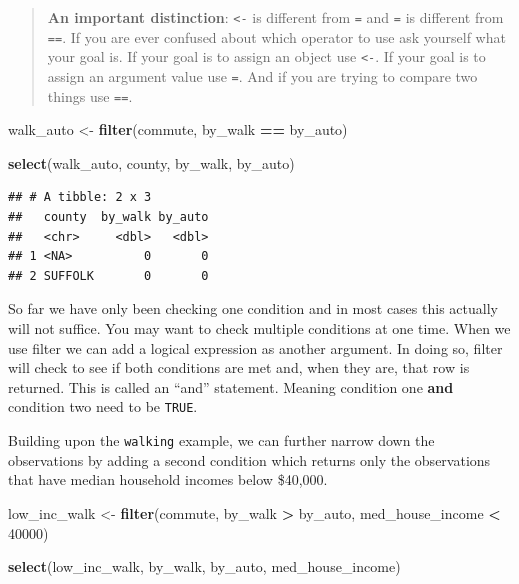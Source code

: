 \documentclass[
]{book}
\newenvironment{Shaded}{\begin{snugshade}}{\end{snugshade}}
\newcommand{\DecValTok}[1]{\textcolor[rgb]{0.00,0.00,0.81}{#1}}
\newcommand{\KeywordTok}[1]{\textcolor[rgb]{0.13,0.29,0.53}{\textbf{#1}}}
\newcommand{\NormalTok}[1]{#1}
\newcommand{\OperatorTok}[1]{\textcolor[rgb]{0.81,0.36,0.00}{\textbf{#1}}}
\newcommand{\StringTok}[1]{\textcolor[rgb]{0.31,0.60,0.02}{#1}}
\begin{document}
\begin{quote}
\textbf{An important distinction}: \texttt{\textless{}-} is different from \texttt{=} and \texttt{=} is different from \texttt{==}. If you are ever confused about which operator to use ask yourself what your goal is. If your goal is to assign an object use \texttt{\textless{}-}. If your goal is to assign an argument value use \texttt{=}. And if you are trying to compare two things use \texttt{==}.
\end{quote}

\begin{Shaded}
\begin{Highlighting}[]
\NormalTok{walk\_auto \textless{}{-}}\StringTok{ }\KeywordTok{filter}\NormalTok{(commute, by\_walk }\OperatorTok{==}\StringTok{ }\NormalTok{by\_auto)}

\KeywordTok{select}\NormalTok{(walk\_auto, county, by\_walk, by\_auto)}
\end{Highlighting}
\end{Shaded}

\begin{verbatim}
## # A tibble: 2 x 3
##   county  by_walk by_auto
##   <chr>     <dbl>   <dbl>
## 1 <NA>          0       0
## 2 SUFFOLK       0       0
\end{verbatim}

So far we have only been checking one condition and in most cases this actually will not suffice. You may want to check multiple conditions at one time. When we use filter we can add a logical expression as another argument. In doing so, filter will check to see if both conditions are met and, when they are, that row is returned. This is called an ``and'' statement. Meaning condition one \textbf{and} condition two need to be \texttt{TRUE}.

Building upon the \texttt{walking} example, we can further narrow down the observations by adding a second condition which returns only the observations that have median household incomes below \$40,000.

\begin{Shaded}
\begin{Highlighting}[]
\NormalTok{low\_inc\_walk \textless{}{-}}\StringTok{ }\KeywordTok{filter}\NormalTok{(commute, }
\NormalTok{                       by\_walk }\OperatorTok{\textgreater{}}\StringTok{ }\NormalTok{by\_auto,}
\NormalTok{                       med\_house\_income }\OperatorTok{\textless{}}\StringTok{ }\DecValTok{40000}\NormalTok{)}

\KeywordTok{select}\NormalTok{(low\_inc\_walk, by\_walk, by\_auto, med\_house\_income)}
\end{Highlighting}
\end{Shaded}
\end{document}
